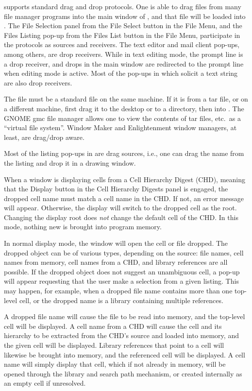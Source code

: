 {\Xic} supports standard drag and drop protocols.  One is able to drag
files from many file manager programs into the main window of {\Xic},
and that file will be loaded into {\Xic}.  The {\cb File Selection}
panel from the {\cb File Select} button in the {\cb File Menu}, and
the {\cb Files Listing} pop-up from the {\cb Files List} button in the
{\cb File Menu}, participate in the protocols as sources and
receivers.  The text editor and mail client pop-ups, among others, are
drop receivers.  While in text editing mode, the prompt line is a drop
receiver, and drops in the main window are redirected to the prompt
line when editing mode is active.  Most of the pop-ups in {\Xic} which
solicit a text string are also drop receivers.

The file must be a standard file on the same machine.  If it is from a
tar file, or on a different machine, first drag it to the desktop or
to a directory, then into {\Xic}.  The GNOME {\et gmc} file manager
allows one to view the contents of tar files, etc.~as a ``virtual file
system''.  {\et Window Maker} and {\et Enlightenment} window managers,
at least, are drag/drop aware.

Most of the listing pop-ups in {\Xic} are drag sources, i.e., one can
drag the name from the listing and drop it in a drawing window.

When a window is displaying cells from a Cell Hierarchy Digest (CHD),
meaning that the {\cb Display} button in the {\cb Cell Hierarchy
Digests} panel is engaged, the dropped cell name must match a cell
name in the CHD.  If not, an error message will appear.  Otherwise,
the display will switch to the dropped cell as the root.  Changing the
display root does {\it not} change the default cell of the CHD.  In
this mode, nothing new is brought into program memory.

In normal display mode, the window will open the cell or file dropped. 
The dropped object can be of various types, depending on the source: 
file names, cell names from memory, cell names from a CHD, and library
references are all possible.  If the dropped object does not suggest
an unambiguous cell, a pop-up will appear requesting that the user
make a selection from a given listing.  This may happen, for example,
when a dropped file name contains more than one top-level cell, or the
dropped name is a library containing multiple references.

A dropped file name will cause the file to be read into memory, and
the top-level cell will be displayed.  A cell name from a CHD will
cause the cell and its hierarchy to be extracted from the CHD's source
and loaded into memory, and the given cell will be displayed.  Library
references that point to a cell will likewise be brought into memory,
and the referenced cell will be displayed.  A cell name will simply
display that cell, which if not already in memory, will be opened
through the library and search path mechanism, or created internally
as an empty cell if unresolved.

